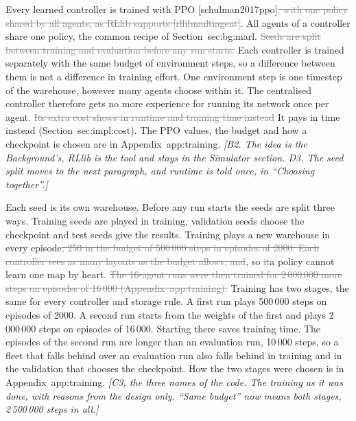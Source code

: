 \documentclass[11pt,a4paper]{article}
\newcommand{\new}[1]{\textcolor{newc}{#1}}
\newcommand{\old}[1]{\textcolor{gray}{\sout{#1}}}
\newcommand{\note}[1]{{\small\itshape [#1]}}
\newcommand{\lab}[1]{\textsf{\footnotesize #1}}
\renewcommand{\ref}[1]{\lab{#1}}
\newcommand{\citep}[1]{[\lab{#1}]}
\begin{document}
Every learned controller is trained with PPO \citep{schulman2017ppo}\old{,
with one policy shared by all agents, as RLlib supports
\citep{rllibmultiagent}}\new{. All agents of a controller share one policy,
the common recipe of Section~\ref{sec:bg:marl}}. \old{Seeds are split between
training and evaluation before any run starts.} Each controller is trained
separately with the same budget of environment steps, so a difference between
them is not a difference in training effort. One environment step is one
timestep of the warehouse, however many agents choose within it. The
centralised controller therefore gets no more experience for running its
network once per agent. \old{Its extra cost shows in runtime and training time
instead} \new{It pays in time instead}
(Section~\ref{sec:impl:cost}). The PPO values, the budget and how a checkpoint
is chosen are in Appendix~\ref{app:training}. \note{B2. The idea is the
Background's, RLlib is the tool and stays in the Simulator section. D3. The
seed split moves to the next paragraph, and runtime is told once, in
``Choosing together''.}

\new{Each seed is its own warehouse. Before any run starts the seeds are split
three ways. Training seeds are played in training, validation seeds choose the
checkpoint and test seeds give the results.} Training plays a new warehouse in
every episode\old{, 250 in the budget of 500\,000 steps in episodes of 2000.
Each controller sees as many layouts as the budget allows, and}\new{, so}
\old{it}\new{a policy} cannot learn one map by heart.
\old{The 16-agent runs were then trained for 2\,000\,000 more steps on
episodes of 16\,000 (Appendix~\ref{app:training}).}
\new{Training has two stages, the same for every controller and storage rule.
A first run plays 500\,000 steps on episodes of 2000. A second run starts from
the weights of the first and plays 2\,000\,000 steps on episodes of 16\,000.
Starting there saves training time. The episodes of the second run are longer
than an evaluation run, 10\,000 steps, so a fleet that falls behind over an
evaluation run also falls behind in training and in the validation that
chooses the checkpoint. How the two stages were chosen is in
Appendix~\ref{app:training}.} \note{C3, the three names of the code. The
training as it was done, with reasons from the design only. ``Same budget''
now means both stages, 2\,500\,000 steps in all.}
\end{document}
